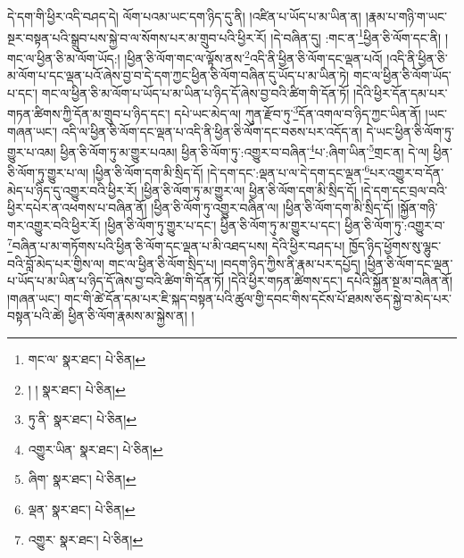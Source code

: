དེ་དག་གི་ཕྱིར་འདི་བཤད་དེ། ལོག་པའམ་ཡང་དག་ཉིད་དུ་ནི། །འཛིན་པ་ཡོད་པ་མ་ཡིན་ན། །རྣམ་པ་གཉི་ག་ཡང་སྔར་བསྟན་པའི་སྒྲུབ་པས་སྐྱེ་བ་ལ་སོགས་པར་མ་གྲུབ་པའི་ཕྱིར་རོ། །དེ་བཞིན་དུ། :གང་ན་\footnote{གང་ལ་  སྣར་ཐང་།  པེ་ཅིན། }ཕྱིན་ཅི་ལོག་དང་ནི། །གང་ལ་ཕྱིན་ཅི་མ་ལོག་ཡོད:། །ཕྱིན་ཅི་ལོག་གང་ལ་ལྟོས་ནས་\footnote{། །  སྣར་ཐང་།  པེ་ཅིན། }འདི་ནི་ཕྱིན་ཅི་ལོག་དང་ལྡན་པའོ། །འདི་ནི་ཕྱིན་ཅི་མ་ལོག་པ་དང་ལྡན་པའོ་ཞེས་བྱ་བ་དེ་དག་ཀྱང་ཕྱིན་ཅི་ལོག་བཞིན་དུ་ཡོད་པ་མ་ཡིན་ཏེ། གང་ལ་ཕྱིན་ཅི་ལོག་ཡོད་པ་དང་། གང་ལ་ཕྱིན་ཅི་མ་ལོག་པ་ཡོད་པ་མ་ཡིན་པ་ཉིད་དོ་ཞེས་བྱ་བའི་ཚིག་གི་དོན་ཏོ། །དེའི་ཕྱིར་དོན་དམ་པར་གཏན་ཚིགས་ཀྱི་དོན་མ་གྲུབ་པ་ཉིད་དང་། དཔེ་ཡང་མེད་ལ། ཀུན་རྫོབ་ཏུ་\footnote{ཏུ་ནི་  སྣར་ཐང་།  པེ་ཅིན། }དོན་འགལ་བ་ཉིད་ཀྱང་ཡིན་ནོ། །ཡང་གཞན་ཡང་། འདི་ལ་ཕྱིན་ཅི་ལོག་དང་ལྡན་པ་འདི་ནི་ཕྱིན་ཅི་ལོག་དང་བཅས་པར་འདོད་ན། དེ་ཡང་ཕྱིན་ཅི་ལོག་ཏུ་གྱུར་པ་འམ། ཕྱིན་ཅི་ལོག་ཏུ་མ་གྱུར་པའམ། ཕྱིན་ཅི་ལོག་ཏུ་:འགྱུར་བ་བཞིན་\footnote{འགྱུར་ཡིན་  སྣར་ཐང་།  པེ་ཅིན། }པ་:ཞིག་ཡིན་\footnote{ཞིག་  སྣར་ཐང་།  པེ་ཅིན། }གྲང་ན། དེ་ལ། ཕྱིན་ཅི་ལོག་ཏུ་གྱུར་པ་ལ། །ཕྱིན་ཅི་ལོག་དག་མི་སྲིད་དོ། །དེ་དག་དང་:ལྡན་པ་ལ་དེ་དག་དང་ལྡན་\footnote{ལྡན་  སྣར་ཐང་།  པེ་ཅིན། }པར་འགྱུར་བ་དོན་མེད་པ་ཉིད་དུ་འགྱུར་བའི་ཕྱིར་རོ། །ཕྱིན་ཅི་ལོག་ཏུ་མ་གྱུར་ལ། ཕྱིན་ཅི་ལོག་དག་མི་སྲིད་དོ། །དེ་དག་དང་བྲལ་བའི་ཕྱིར་དཔེར་ན་འཕགས་པ་བཞིན་ནོ། །ཕྱིན་ཅི་ལོག་ཏུ་འགྱུར་བཞིན་ལ། །ཕྱིན་ཅི་ལོག་དག་མི་སྲིད་དོ། །སྐྱོན་གཉི་གར་འགྱུར་བའི་ཕྱིར་རོ། །ཕྱིན་ཅི་ལོག་ཏུ་གྱུར་པ་དང་། ཕྱིན་ཅི་ལོག་ཏུ་མ་གྱུར་པ་དང་། ཕྱིན་ཅི་ལོག་ཏུ་:འགྱུར་བ་\footnote{འགྱུར་  སྣར་ཐང་།  པེ་ཅིན། }བཞིན་པ་མ་གཏོགས་པའི་ཕྱིན་ཅི་ལོག་དང་ལྡན་པ་མི་འཐད་པས། དེའི་ཕྱིར་བཤད་པ། ཁྱོད་ཉིད་ཕྱོགས་སུ་ལྷུང་བའི་བློ་མེད་པར་གྱིས་ལ། གང་ལ་ཕྱིན་ཅི་ལོག་སྲིད་པ། །བདག་ཉིད་ཀྱིས་ནི་རྣམ་པར་དཔྱོད། །ཕྱིན་ཅི་ལོག་དང་ལྡན་པ་ཡོད་པ་མ་ཡིན་པ་ཉིད་དོ་ཞེས་བྱ་བའི་ཚིག་གི་དོན་ཏོ། །དེའི་ཕྱིར་གཏན་ཚིགས་དང་། དཔེའི་སྐྱོན་སྔ་མ་བཞིན་ནོ། །གཞན་ཡང་། གང་གི་ཚེ་དོན་དམ་པར་ཇི་སྐད་བསྟན་པའི་ཚུལ་གྱི་དབང་གིས་དངོས་པོ་ཐམས་ཅད་སྐྱེ་བ་མེད་པར་བསྟན་པའི་ཚེ། ཕྱིན་ཅི་ལོག་རྣམས་མ་སྐྱེས་ན། །

